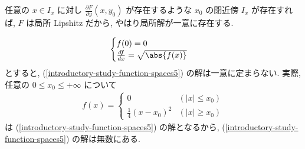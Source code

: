 \documentclass[openany, a4paper, oneside]{jsbook}
\begin{document}
\begin{rem}
任意の $x \in I_x$ に対し $\frac{\partial F}{\partial y}(x, y_0)$ が存在するような
$x_0$ の閉近傍 $I_x$ が存在すれば, $F$ は局所 Lipshitz だから, やはり局所解が一意に存在する.
\end{rem}
\begin{ex}
\begin{align}
 \begin{cases}
  f(0)
  =
  0 \\
  \frac{df}{dx}
  =
  \sqrt{\abs{f(x)}}
 \end{cases}\label{introductory-study-function-spaces5}
\end{align}
とすると, (\ref{introductory-study-function-spaces5}) の解は一意に定まらない.
実際, 任意の $0 \leq x_0 \leq + \infty$ について
\begin{align*}
 f(x)
 =
 \begin{cases}
  0 & (|x|\leq x_0) \\
  \frac{1}{4}(x - x_0)^2 & (|x|\geq x_0)
 \end{cases}
\end{align*}
は (\ref{introductory-study-function-spaces5}) の解となるから, (\ref{introductory-study-function-spaces5}) の解は無数にある.
\end{ex}
\end{document}
